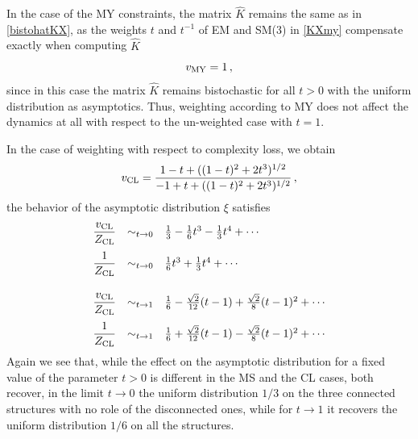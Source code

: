 \documentclass[12pt]{amsart}
\numberwithin{equation}{section}
\begin{document}
In the case of the MY constraints, the matrix $\hat K$ remains the same as in \eqref{bistohatKX}, as
the weights $t$ and $t^{-1}$ of EM and SM(3) in \eqref{KXmy} compensate exactly when
computing $\hat K$ 
\begin{equation}\label{vmy}
v_{{\rm MY}}= 1 \, ,
\end{equation}
since in this case the matrix $\hat K$ remains bistochastic for all $t>0$ with the uniform distribution as
asymptotics. Thus, weighting according to MY does not affect the dynamics at all with respect to the
un-weighted case with $t=1$. 

In the case of weighting with respect to complexity loss, we obtain 
\begin{equation}\label{vcl}
v_{{\rm CL}}=  \frac{1-t + ((1-t)^2 + 2 t^3)^{1/2}}{-1+t  + ((1-t)^2 + 2 t^3)^{1/2}}\, ,
\end{equation}
the behavior of the asymptotic distribution $\xi$ satisfies
\begin{equation}\label{xicl}
\begin{array}{lcl}
\displaystyle{
 \frac{ v_{\rm CL} }{ Z_{\rm CL} } 
 } 
 & \sim_{t\to 0} &    \frac{1}{3} - \frac{1}{6} t^3 - \frac{1}{3} t^4  + \cdots    \\[4mm]
\displaystyle{ 
 \frac{1}{ Z_{\rm CL} }  
} 
& \sim_{t\to 0} &      \frac{1}{6} t^3 + \frac{1}{3} t^4  + \cdots                        \\[7mm]
\displaystyle{ 
\frac{ v_{\rm CL} }{ Z_{\rm CL} } 
} 
& \sim_{t\to 1} &      \frac{1}{6} - \frac{\sqrt{2}}{12} (t - 1) + \frac{\sqrt{2}}{8} (t - 1)^2  + \cdots    \\[4mm]
\displaystyle{ 
 \frac{1}{ Z_{\rm CL} } 
 } 
 & \sim_{t\to 1} & \frac{1}{6} + \frac{\sqrt{2}}{12} (t - 1) - \frac{\sqrt{2}}{8} (t - 1)^2  + \cdots  
\end{array}
\end{equation}
Again we see that, while the effect on the asymptotic distribution for a fixed value of
the parameter $t>0$ is different in the MS and the CL cases, both recover, in the limit $t\to 0$
the uniform distribution $1/3$ on the three connected structures with no role of the disconnected ones,
while for $t\to 1$ it recovers the uniform distribution $1/6$ on all the structures. 
\end{document}
